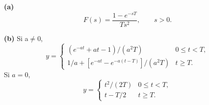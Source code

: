 \noindent\textbf{(a)} \[F(s)=\frac{1-e^{-sT}}{Ts^2},\qquad s>0.\]

\noindent\textbf{(b)} Si a\ensuremath{\ne}0,
\[y=\begin{cases}(e^{-at}+at-1)/(a^2T)&0\le t<T,\\1/a+[e^{-at}-e^{-a(t-T)}]/(a^2T)&t\ge T.\end{cases}\]
Si \(a=0\),
\[y=\begin{cases}t^2/(2T)&0\le t<T,\\t-T/2&t\ge T.\end{cases}\]
